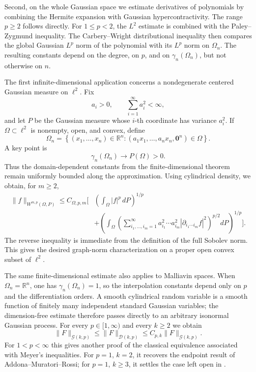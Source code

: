 \documentclass[12pt]{article}
\theoremstyle{plain}
\theoremstyle{definition}
\theoremstyle{remark}
\numberwithin{equation}{section}
\newcommand{\rr}{\mathbb{R}}
\begin{document}
Second, on the whole Gaussian space we estimate derivatives of polynomials by combining the Hermite expansion with Gaussian hypercontractivity.  The range $p\geqslant2$ follows directly.  For $1\leqslant p<2$, the $L^2$ estimate is combined with the Paley--Zygmund inequality.  The Carbery--Wright distributional inequality \cite{CW} then compares the global Gaussian $L^p$ norm of the polynomial with its $L^p$ norm on $\Omega_n$.  The resulting constants depend on the degree, on $p$, and on $\gamma_n(\Omega_n)$, but not otherwise on $n$.

The first infinite-dimensional application concerns a nondegenerate centered Gaussian measure on $\ell^2$.  Fix
\[
a_i>0,\qquad \sum_{i=1}^{\infty}a_i^2<\infty,
\]
and let $P$ be the Gaussian measure whose $i$-th coordinate has variance $a_i^2$.  If $\Omega\subset\ell^2$ is nonempty, open, and convex, define
\[
\Omega_n
=
\left\{
(x_1,\ldots,x_n)\in\rr^n:
(a_1x_1,\ldots,a_nx_n,\mathbf0^n)\in\Omega
\right\}.
\]
A key point is
\[
\gamma_n(\Omega_n)\longrightarrow P(\Omega)>0.
\]
Thus the domain-dependent constants from the finite-dimensional theorem remain uniformly bounded along the approximation.  Using cylindrical density, we obtain, for $m\geqslant2$,
\[
\begin{aligned}
\|f\|_{W^{m,p}(\Omega,P)}
\leqslant C_{\Omega,p,m}
\Bigg[
&\left(\int_\Omega |f|^p\,dP\right)^{1/p}
\\
&+
\left(
\int_\Omega
\left(
\sum_{i_1,\ldots,i_m=1}^{\infty}
 a_{i_1}^2\cdots a_{i_m}^2
|\partial_{i_1\cdots i_m}f|^2
\right)^{p/2}
 dP
\right)^{1/p}
\Bigg].
\end{aligned}
\]
The reverse inequality is immediate from the definition of the full Sobolev norm.  This gives the desired graph-norm characterization on a proper open convex subset of $\ell^2$.

The same finite-dimensional estimate also applies to Malliavin spaces.  When $\Omega_n=\rr^n$, one has $\gamma_n(\Omega_n)=1$, so the interpolation constants depend only on $p$ and the differentiation orders.  A smooth cylindrical random variable is a smooth function of finitely many independent standard Gaussian variables; the dimension-free estimate therefore passes directly to an arbitrary isonormal Gaussian process.  For every $p\in[1,\infty)$ and every $k\geqslant2$ we obtain
\[
\|F\|_{\mathcal G(k,p)}
\leqslant
\|F\|_{\mathcal D(k,p)}
\leqslant
C_{p,k}\|F\|_{\mathcal G(k,p)}.
\]
For $1<p<\infty$ this gives another proof of the classical equivalence associated with Meyer's inequalities.  For $p=1$, $k=2$, it recovers the endpoint result of Addona--Muratori--Rossi; for $p=1$, $k\geqslant3$, it settles the case left open in \cite{AddonaMuratoriRossi}.
\end{document}
